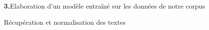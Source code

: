 \documentclass[letterpaper,portrait,12pt]{article}
\begin{document}
\textbf{{\Large 3.}}{\Large  Elaboration d'un mod\`{e}le entra\^{i}n\'{e} sur les donn\'{e}es de notre corpus}








	R\'{e}cup\'{e}ration et normalisation des textes
\end{document}
